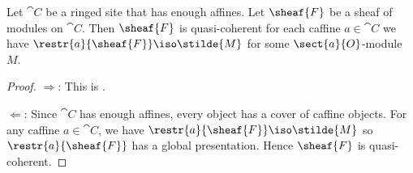 \begin{lemma}
Let $\cat{C}$ be a ringed site that has enough affines.
Let $\sheaf{F}$ be a sheaf of modules on $\cat{C}$.
Then $\sheaf{F}$ is quasi-coherent 
\iff for each caffine $a\in \cat{C}$ 
we have $\restr{a}{\sheaf{F}} \iso \stilde{M}$ for some $\sect{a}{O}$-module $M$.
\end{lemma}

\begin{proof}
$\Rightarrow$: This is .

$\Leftarrow$: Since $\cat{C}$ has enough affines, every object has a cover of caffine objects. For any caffine $a\in \cat{C}$, we have $\restr{a}{\sheaf{F}} \iso \stilde{M}$
so $\restr{a}{\sheaf{F}}$ has a global presentation.
Hence $\sheaf{F}$ is quasi-coherent.
\end{proof}


